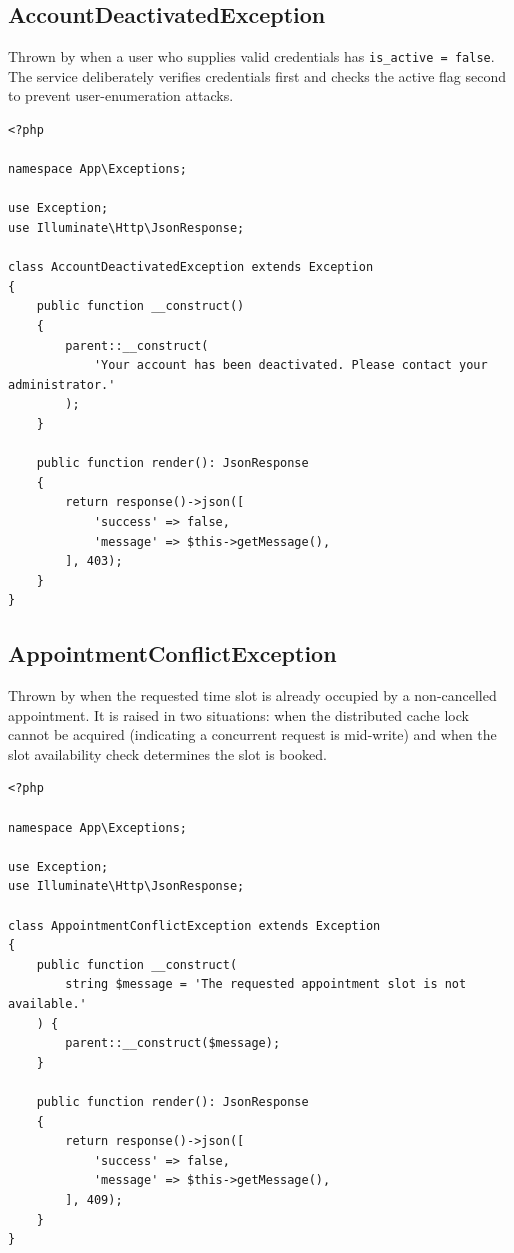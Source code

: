 \subsection{AccountDeactivatedException}
\label{sec:ex-account-deactivated}

Thrown by  when a user who supplies valid
credentials has \texttt{is\_active = false}. The service deliberately
verifies credentials first and checks the active flag second to prevent
user-enumeration attacks.

\begin{lstlisting}[style=php, caption={\texttt{app/Exceptions/AccountDeactivatedException.php}.}]
<?php

namespace App\Exceptions;

use Exception;
use Illuminate\Http\JsonResponse;

class AccountDeactivatedException extends Exception
{
    public function __construct()
    {
        parent::__construct(
            'Your account has been deactivated. Please contact your administrator.'
        );
    }

    public function render(): JsonResponse
    {
        return response()->json([
            'success' => false,
            'message' => $this->getMessage(),
        ], 403);
    }
}
\end{lstlisting}

\subsection{AppointmentConflictException}
\label{sec:ex-appointment-conflict}

Thrown by  when the requested time slot
is already occupied by a non-cancelled appointment. It is raised in
two situations: when the distributed cache lock cannot be acquired
(indicating a concurrent request is mid-write) and when the slot
availability check determines the slot is booked.

\begin{lstlisting}[style=php, caption={\texttt{app/Exceptions/AppointmentConflictException.php}.}]
<?php

namespace App\Exceptions;

use Exception;
use Illuminate\Http\JsonResponse;

class AppointmentConflictException extends Exception
{
    public function __construct(
        string $message = 'The requested appointment slot is not available.'
    ) {
        parent::__construct($message);
    }

    public function render(): JsonResponse
    {
        return response()->json([
            'success' => false,
            'message' => $this->getMessage(),
        ], 409);
    }
}
\end{lstlisting}

